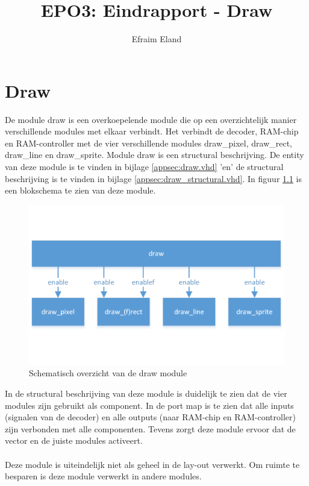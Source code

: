 \documentclass{scrartcl} %
\author{Efraim Eland}
\title{EPO3: Eindrapport - Draw}
\begin{document}
\chapter{Draw}
\label{ch:draw}

De module draw is een overkoepelende module die op een overzichtelijk manier verschillende modules met elkaar verbindt. Het verbindt de decoder, RAM-chip en RAM-controller met de vier verschillende modules draw\_pixel, draw\_rect, draw\_line en draw\_sprite. Module draw is een structural beschrijving. De entity van deze module is te vinden in bijlage \ref{appsec:draw.vhd} 'en' de structural beschrijving is te vinden in bijlage \ref{appsec:draw_structural.vhd}. In figuur \ref{fig:draw} is een blokschema te zien van deze module.

\begin{figure}[H]
	\centering
	\includegraphics[width=\textwidth]{resource/draw.png}
	\caption{Schematisch overzicht van de draw module}
	\label{fig:draw}
\end{figure}

In de structural beschrijving van deze module is duidelijk te zien dat de vier modules zijn gebruikt als component. In de port map is te zien dat alle inputs (signalen van de decoder) en alle outputs (naar RAM-chip en RAM-controller) zijn verbonden met alle componenten. Tevens zorgt deze module ervoor dat de vector en de juiste modules activeert.
\\\\
Deze module is uiteindelijk niet als geheel in de lay-out verwerkt. Om ruimte te besparen is deze module verwerkt in andere modules.
\end{document}
